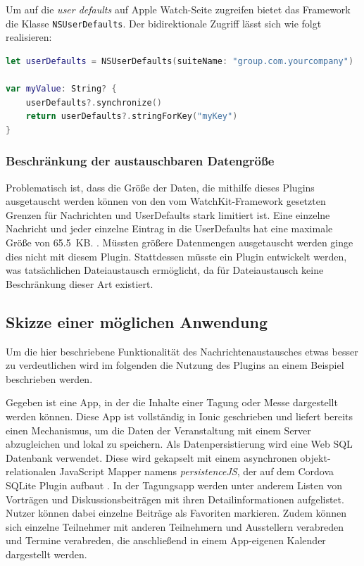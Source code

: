 Um auf die \emph{user defaults} auf Apple Watch-Seite zugreifen bietet das Framework die Klasse \texttt{NSUserDefaults}. Der bidirektionale Zugriff lässt sich wie folgt realisieren:
\begin{lstlisting}[language=swift, breaklines=true]
let userDefaults = NSUserDefaults(suiteName: "group.com.yourcompany")

var myValue: String? {
    userDefaults?.synchronize()
    return userDefaults?.stringForKey("myKey")
}
\end{lstlisting}
%
\subsubsection{Beschränkung der austauschbaren Datengröße}
Problematisch ist, dass die Größe der Daten, die mithilfe dieses Plugins ausgetauscht werden können von den vom WatchKit-Framework gesetzten Grenzen für Nachrichten und UserDefaults stark limitiert ist. Eine einzelne Nachricht und jeder einzelne Eintrag in die UserDefaults hat eine maximale Größe von 65.5~KB. \cite{appleWatchPayloadMaximumDatatransfer}. Müssten größere Datenmengen ausgetauscht werden ginge dies nicht mit diesem Plugin. Stattdessen müsste ein Plugin entwickelt werden, was tatsächlichen Dateiaustausch ermöglicht, da für Dateiaustausch keine Beschränkung dieser Art existiert.
%
%
\subsection{Skizze einer möglichen Anwendung}
%
Um die hier beschriebene Funktionalität des Nachrichtenaustausches etwas besser zu verdeutlichen wird im folgenden die Nutzung des Plugins an einem Beispiel beschrieben werden.

Gegeben ist eine App, in der die Inhalte einer Tagung oder Messe dargestellt werden können. Diese App ist vollständig in Ionic geschrieben und liefert bereits einen Mechanismus, um die Daten der Veranstaltung mit einem Server abzugleichen und lokal zu speichern. Als Datenpersistierung wird eine Web SQL Datenbank verwendet. Diese wird gekapselt mit einem asynchronen objekt-relationalen JavaScript Mapper namens \emph{persistenceJS}, der auf dem Cordova SQLite Plugin aufbaut \cite{persistenceJSDoku}. In der Tagungsapp werden unter anderem Listen von Vorträgen und Diskussionsbeiträgen mit ihren Detailinformationen aufgelistet. Nutzer können dabei einzelne Beiträge als Favoriten markieren. Zudem können sich einzelne Teilnehmer mit anderen Teilnehmern und Ausstellern verabreden und Termine verabreden, die anschließend in einem App-eigenen Kalender dargestellt werden.


